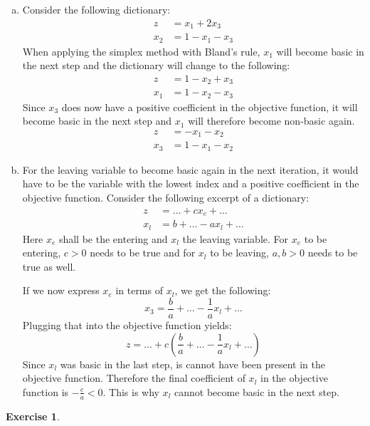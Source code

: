 \documentclass[a4paper,12pt,headsepline]{scrartcl}
\newtheorem{aufgabe}{Exercise}
\begin{document}
\begin{enumerate}[a)]
  \item Consider the following dictionary:
    \begin{align*}
      z &= x_1 +2x_3 \\
      x_2 &= 1 -x_1 -x_3
    \end{align*}
    When applying the simplex method with Bland's rule, $x_1$ will become basic in the next step and the dictionary will change to the following:
    \begin{align*}
      z &= 1 -x_2 +x_3 \\
      x_1 &= 1 -x_2 -x_3
    \end{align*}
    Since $x_3$ does now have a positive coefficient in the objective function, it will become basic in the next step and $x_1$ will therefore become non-basic again.
    \begin{align*}
      z &= -x_1 -x_2 \\
      x_3 &= 1 -x_1 -x_2
    \end{align*}

  \item For the leaving variable to become basic again in the next iteration, it would have to be the variable with the lowest index and a positive coefficient in the objective function.
    Consider the following excerpt of a dictionary:
    \begin{align*}
      z &= \dots +cx_e +\dots \\
      x_l &= b +\dots -ax_l +\dots
    \end{align*}
    Here $x_e$ shall be the entering and $x_l$ the leaving variable.
    For $x_e$ to be entering, $c>0$ needs to be true and for $x_l$ to be leaving, $a,b>0$ needs to be true as well.

    If we now express $x_e$ in terms of $x_l$, we get the following:
    \[ x_3 = \frac ba +\dots -\frac 1a x_l +\dots \]
    Plugging that into the objective function yields:
    \[ z = \dots +c \left(\frac ba +\dots -\frac 1a x_l +\dots\right) \]
    Since $x_l$ was basic in the last step, is cannot have been present in the objective function.
    Therefore the final coefficient of $x_l$ in the objective function is $-\frac ca<0$.
    This is why $x_l$ cannot become basic in the next step.
\end{enumerate}

\newpage
\begin{aufgabe}
\end{aufgabe}
\end{document}
